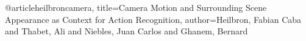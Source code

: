 @article{heilbroncamera,
  title={Camera Motion and Surrounding Scene Appearance as Context for Action Recognition},
  author={Heilbron, Fabian Caba and Thabet, Ali and Niebles, Juan Carlos and Ghanem, Bernard}
}
